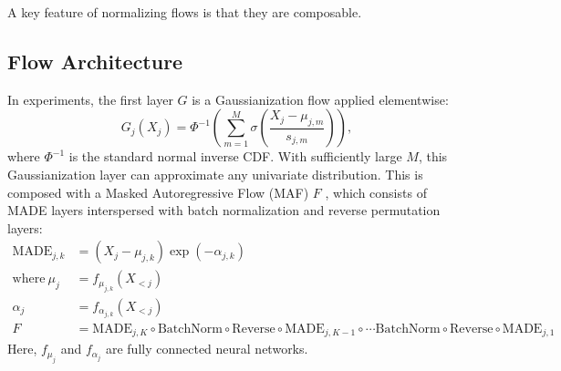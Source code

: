 \documentclass{article}
\begin{document}
A key feature of normalizing flows is that they are composable.

\subsection{Flow Architecture}
In experiments, the first layer $G$ is a Gaussianization flow \citep{mengGaussianizationFlows2020b} applied elementwise:
\[
  G_{j} (X_{j}) = \Phi^{-1} \left (\sum_{m=1}^{M}\sigma \left( \frac{X_{j} - \mu_{j,m}}{s_{j, m}} \right) \right),
\]
where $\Phi^{-1}$ is the standard normal inverse CDF.
With sufficiently large $M$, this Gaussianization layer can approximate any univariate distribution.
This is composed with a Masked Autoregressive Flow (MAF) $F$ \citep{papamakariosMaskedAutoregressiveFlow2017}, which consists of MADE layers interspersed with batch normalization and reverse permutation layers:
\[
  \begin{split}
    \textrm{MADE}_{j, k} &= (X_{j} - \mu_{j,k}) \exp (-\alpha_{j,k}) \\
    \text{where}~\mu_{j} &= f_{\mu_{j,k}}(X_{< j}) \\
    \alpha_{j} &= f_{\alpha_{j, k}}(X_{< j}) \\
    F &= \textrm{MADE}_{j, K} \circ \textrm{BatchNorm} \circ \textrm{Reverse} \circ \textrm{MADE}_{j, K-1} \circ \cdots \textrm{BatchNorm} \circ \textrm{Reverse} \circ \textrm{MADE}_{j, 1}
\end{split}
\]
Here, $f_{\mu_{j}}$ and $f_{\alpha_{j}}$ are fully connected neural networks.
\end{document}
